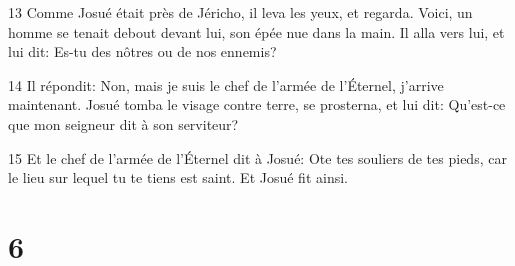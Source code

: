 \par 13 Comme Josué était près de Jéricho, il leva les yeux, et regarda. Voici, un homme se tenait debout devant lui, son épée nue dans la main. Il alla vers lui, et lui dit: Es-tu des nôtres ou de nos ennemis?
\par 14 Il répondit: Non, mais je suis le chef de l'armée de l'Éternel, j'arrive maintenant. Josué tomba le visage contre terre, se prosterna, et lui dit: Qu'est-ce que mon seigneur dit à son serviteur?
\par 15 Et le chef de l'armée de l'Éternel dit à Josué: Ote tes souliers de tes pieds, car le lieu sur lequel tu te tiens est saint. Et Josué fit ainsi.

\chapter{6}

